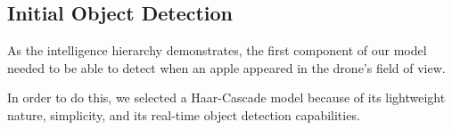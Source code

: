 \subsection{Initial Object Detection}
As the intelligence hierarchy demonstrates, the first component of our model needed to be able to detect when an apple appeared in the drone's field of view. 

In order to do this, we selected a Haar-Cascade model because of its lightweight nature, simplicity, and its real-time object detection capabilities. 